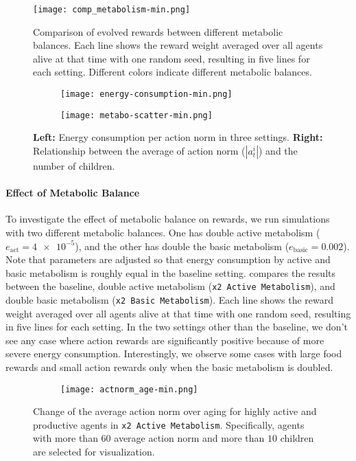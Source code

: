 \begin{figure}[!htb]
  \centering
  \texttt{[image: comp\_metabolism-min.png]}
  \caption{
    Comparison of evolved rewards between different metabolic balances.
    Each line shows the reward weight averaged over all agents alive at that time with one random seed, resulting in five lines for each setting.
    Different colors indicate different metabolic balances.
  }\label{figure:result-metabolism}
\end{figure}

\begin{figure}[t]
  \begin{subfigure}[t]{3cm}
    \centering
    \texttt{[image: energy-consumption-min.png]}
  \end{subfigure}
  \begin{subfigure}[t]{5cm}
    \centering
    \texttt{[image: metabo-scatter-min.png]}
  \end{subfigure}
  \caption{
    \textbf{Left:} Energy consumption per action norm in three settings.
    \textbf{Right:} Relationship between the average of action norm ($|a_{t}^{i}|$) and the number of children.
  }\label{figure:scatter-metabo}
\end{figure}

\paragraph{Effect of Metabolic Balance}
To investigate the effect of metabolic balance on rewards, we run simulations with two different metabolic balances. One has double active metabolism ($e_{\mathrm{act}} = \num{4e-5}$), and the other has double the basic metabolism ($e_{\mathrm{basic}} = 0.002$). Note that parameters are adjusted so that energy consumption by active and basic metabolism is roughly equal in the baseline setting.
 compares the results between the baseline, double active metabolism (\texttt{x2 Active Metabolism}), and double basic metabolism (\texttt{x2 Basic Metabolism}). Each line shows the reward weight averaged over all agents alive at that time with one random seed, resulting in five lines for each setting. In the two settings other than the baseline, we don't see any case where action rewards are significantly positive because of more severe energy consumption.
Interestingly, we observe some cases with large food rewards and small action rewards only when the basic metabolism is doubled.

\begin{figure}[t]
  \begin{subfigure}[t]{7cm}
    \centering
    \texttt{[image: actnorm\_age-min.png]}
  \end{subfigure}
  \caption{Change of the average action norm over aging for highly active and productive agents in \texttt{x2 Active Metabolism}. Specifically, agents with more than $60$ average action norm and more than $10$ children are selected for visualization.}\label{figure:actnorm-age}
\end{figure}

